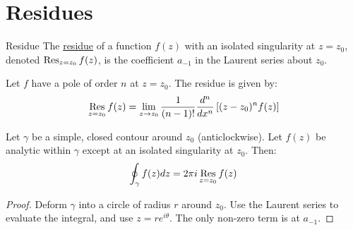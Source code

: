 \documentclass[../Main.tex]{subfiles}
\begin{document}
\section{Residues}
\begin{definition}{Residue}
    The \underline{residue} of a function $f(z)$ with an isolated singularity at $z = z_0$, denoted $\operatorname*{Res}_{z = z_0} f(z)$, is the coefficient $a_{-1}$ in the Laurent series about $z_0$.
\end{definition}
\begin{proposition}
    Let $f$ have a pole of order $n$ at $z = z_0$. The residue is given by:
    \begin{equation*}
        \operatorname*{Res}_{z = z_0} f(z) = \lim_{z \to z_0} \frac{1}{(n-1)!} \frac{d^{n}}{dx^{n}} \left[(z - z_0)^n f(z)\right]
    \end{equation*}
    \label{propResFormula}
\end{proposition}
\begin{theorem}
    Let $\gamma$ be a simple, closed contour around $z_0$ (anticlockwise). Let $f(z)$ be analytic within $\gamma$ except at an isolated singularity at $z_0$. Then:
    \begin{equation*}
        \oint_\gamma f(z) dz = 2\pi i \operatorname*{Res}_{z = z_0} f(z)
    \end{equation*}
    \label{thmResidue}
\end{theorem}
\begin{proof}
    Deform $\gamma$ into a circle of radius $r$ around $z_0$. Use the Laurent series to evaluate the integral, and use $z = re^{i\theta}$. The only non-zero term is at $a_{-1}$.
\end{proof}
\end{document}
